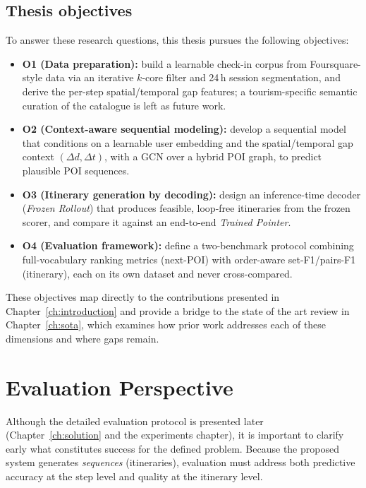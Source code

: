 \subsection{Thesis objectives}
To answer these research questions, this thesis pursues the following objectives:
\begin{itemize}[leftmargin=*]
    \item \textbf{O1 (Data preparation):} build a learnable check-in corpus from Foursquare-style data via an iterative $k$-core filter and 24\,h session segmentation, and derive the per-step spatial/temporal gap features; a tourism-specific semantic curation of the catalogue is left as future work.
    \item \textbf{O2 (Context-aware sequential modeling):} develop a sequential model that conditions on a learnable user embedding and the spatial/temporal gap context $(\Delta d,\Delta t)$, with a GCN over a hybrid POI graph, to predict plausible POI sequences.
    \item \textbf{O3 (Itinerary generation by decoding):} design an inference-time decoder (\emph{Frozen Rollout}) that produces feasible, loop-free itineraries from the frozen scorer, and compare it against an end-to-end \emph{Trained Pointer}.
    \item \textbf{O4 (Evaluation framework):} define a two-benchmark protocol combining full-vocabulary ranking metrics (next-POI) with order-aware set-F1/pairs-F1 (itinerary), each on its own dataset and never cross-compared.
\end{itemize}

These objectives map directly to the contributions presented in Chapter~\ref{ch:introduction} and provide a bridge to the state of the art review in Chapter~\ref{ch:sota}, which examines how prior work addresses each of these dimensions and where gaps remain.

\section{Evaluation Perspective}
\label{sec:prob-eval}

Although the detailed evaluation protocol is presented later (Chapter~\ref{ch:solution} and the experiments chapter), it is important to clarify early what constitutes success for the defined problem. Because the proposed system generates \emph{sequences} (itineraries), evaluation must address both predictive accuracy at the step level and quality at the itinerary level.

